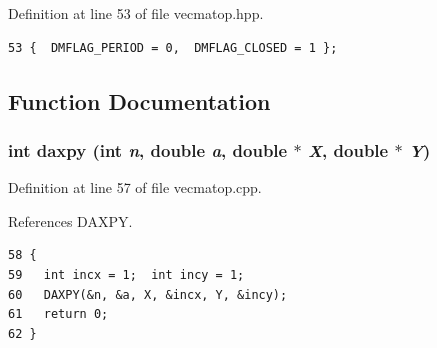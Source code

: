\begin{Desc}
\item[Enumerator: ]\par
\begin{description}
\item[{\em 
DMFLAG\_\-PERIOD\label{vecmatop_8hpp_68986ab776eb5d6b5a809a1c005a7300_68986ab776eb5d6b5a809a1c005a7300a8081f7a07a399ed0e6dcb3162291bde}
}]\item[{\em 
DMFLAG\_\-CLOSED\label{vecmatop_8hpp_68986ab776eb5d6b5a809a1c005a7300_68986ab776eb5d6b5a809a1c005a7300df94bb986d4f0a380c3ae5e7170b71f2}
}]\end{description}
\end{Desc}



Definition at line 53 of file vecmatop.hpp.

\footnotesize\begin{verbatim}53 {  DMFLAG_PERIOD = 0,  DMFLAG_CLOSED = 1 };
\end{verbatim}\normalsize 




\subsection{Function Documentation}
\subsubsection{\setlength{\rightskip}{0pt plus 5cm}int daxpy (int {\em n}, double {\em a}, double $\ast$ {\em X}, double $\ast$ {\em Y})}\label{vecmatop_8hpp_42f36f4fc8b532e752c7329e335ac044_42f36f4fc8b532e752c7329e335ac044}




Definition at line 57 of file vecmatop.cpp.

References DAXPY.

\footnotesize\begin{verbatim}58 {
59   int incx = 1;  int incy = 1;
60   DAXPY(&n, &a, X, &incx, Y, &incy);
61   return 0;
62 }
\end{verbatim}\normalsize 


